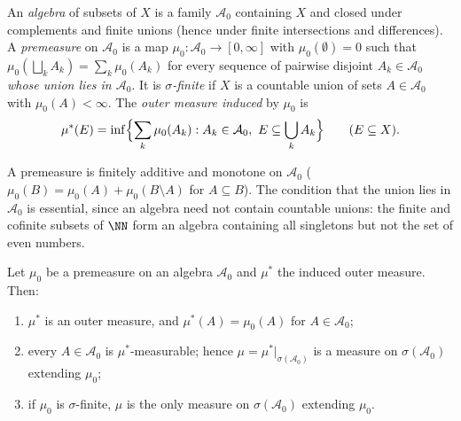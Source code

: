 \begin{definition}\label{measure-theory:definition-premeasure}
An \emph{algebra} of subsets of $X$ is a family $\mathcal{A}_0$ containing $X$ and closed under complements and finite unions (hence under finite intersections and differences). A
\emph{premeasure} on $\mathcal{A}_0$ is a map $\mu_0 \colon \mathcal{A}_0 \to [0, \infty]$ with $\mu_0(\emptyset) = 0$ such that $\mu_0(\bigsqcup_kA_k) = \sum_k\mu_0(A_k)$ for every sequence of
pairwise disjoint $A_k \in \mathcal{A}_0$ \emph{whose union lies in $\mathcal{A}_0$}. It is \emph{$\sigma$-finite} if $X$ is a countable union of sets $A \in \mathcal{A}_0$ with $\mu_0(A) < \infty$.
The \emph{outer measure induced} by $\mu_0$ is
\[
\mu^*(E) = \inf\Bigl\{\sum_k\mu_0(A_k) : A_k \in \mathcal{A}_0, \ E \subseteq \bigcup_kA_k\Bigr\} \qquad (E \subseteq X).
\]
\end{definition}

A premeasure is finitely additive and monotone on $\mathcal{A}_0$ ($\mu_0(B) = \mu_0(A) + \mu_0(B \setminus A)$ for $A \subseteq B$). The condition that the union lies in $\mathcal{A}_0$ is
essential, since an algebra need not contain countable unions: the finite and cofinite subsets of $\NN$ form an algebra containing all singletons but not the set of even numbers.

\begin{theorem}\label{measure-theory:theorem-extension}
Let $\mu_0$ be a premeasure on an algebra $\mathcal{A}_0$ and $\mu^*$ the induced outer measure. Then:
\begin{enumerate}
\item $\mu^*$ is an outer measure, and $\mu^*(A) = \mu_0(A)$ for $A \in \mathcal{A}_0$;
\item every $A \in \mathcal{A}_0$ is $\mu^*$-measurable; hence $\mu = \mu^*|_{\sigma(\mathcal{A}_0)}$ is a measure on $\sigma(\mathcal{A}_0)$ extending $\mu_0$;
\item if $\mu_0$ is $\sigma$-finite, $\mu$ is the only measure on $\sigma(\mathcal{A}_0)$ extending $\mu_0$.
\end{enumerate}
\end{theorem}

